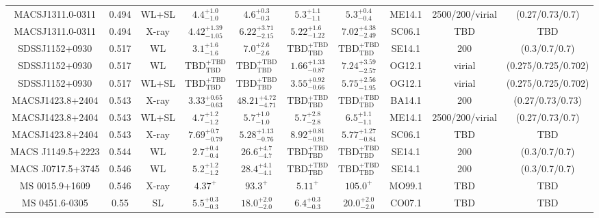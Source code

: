 \begin{table}
\begin{tabular}{cccccccccc}
MACSJ1311.0-0311 & 0.494 & WL+SL & ${4.4}^{+1.0}_{-1.0}$ & ${4.6}^{+0.3}_{-0.3}$ & ${5.3}^{+1.1}_{-1.1}$ & ${5.3}^{+0.4}_{-0.4}$ & ME14.1 & 2500/200/virial & (0.27/0.73/0.7) \\
MACSJ1311.0-0311 & 0.494 & X-ray & ${4.42}^{+1.39}_{-1.05}$ & ${6.22}^{+3.71}_{-2.15}$ & ${5.22}^{+1.6}_{-1.22}$ & ${7.02}^{+4.38}_{-2.49}$ & SC06.1 & TBD & TBD \\
SDSSJ1152+0930 & 0.517 & WL & ${3.1}^{+1.6}_{-1.6}$ & ${7.0}^{+2.6}_{-2.6}$ & ${\mathrm{TBD}}^{+\mathrm{TBD}}_{\mathrm{TBD}}$ & ${\mathrm{TBD}}^{+\mathrm{TBD}}_{\mathrm{TBD}}$ & SE14.1 & 200 & (0.3/0.7/0.7) \\
SDSSJ1152+0930 & 0.517 & WL & ${\mathrm{TBD}}^{+\mathrm{TBD}}_{\mathrm{TBD}}$ & ${\mathrm{TBD}}^{+\mathrm{TBD}}_{\mathrm{TBD}}$ & ${1.66}^{+1.33}_{-0.87}$ & ${7.24}^{+3.59}_{-2.57}$ & OG12.1 & virial & (0.275/0.725/0.702) \\
SDSSJ1152+0930 & 0.517 & WL+SL & ${\mathrm{TBD}}^{+\mathrm{TBD}}_{\mathrm{TBD}}$ & ${\mathrm{TBD}}^{+\mathrm{TBD}}_{\mathrm{TBD}}$ & ${3.55}^{+0.92}_{-0.66}$ & ${5.75}^{+2.56}_{-1.95}$ & OG12.1 & virial & (0.275/0.725/0.702) \\
MACSJ1423.8+2404 & 0.543 & X-ray & ${3.33}^{+0.65}_{-0.63}$ & ${48.21}^{+4.72}_{-4.71}$ & ${\mathrm{TBD}}^{+\mathrm{TBD}}_{\mathrm{TBD}}$ & ${\mathrm{TBD}}^{+\mathrm{TBD}}_{\mathrm{TBD}}$ & BA14.1 & 200 & (0.27/0.73/0.73) \\
MACSJ1423.8+2404 & 0.543 & WL+SL & ${4.7}^{+1.2}_{-1.2}$ & ${5.7}^{+1.0}_{-1.0}$ & ${5.7}^{+2.8}_{-2.8}$ & ${6.5}^{+1.1}_{-1.1}$ & ME14.1 & 2500/200/virial & (0.27/0.73/0.7) \\
MACSJ1423.8+2404 & 0.543 & X-ray & ${7.69}^{+0.7}_{-0.79}$ & ${5.28}^{+1.13}_{-0.76}$ & ${8.92}^{+0.81}_{-0.91}$ & ${5.77}^{+1.27}_{-0.84}$ & SC06.1 & TBD & TBD \\
MACS J1149.5+2223 & 0.544 & WL & ${2.7}^{+0.4}_{-0.4}$ & ${26.6}^{+4.7}_{-4.7}$ & ${\mathrm{TBD}}^{+\mathrm{TBD}}_{\mathrm{TBD}}$ & ${\mathrm{TBD}}^{+\mathrm{TBD}}_{\mathrm{TBD}}$ & SE14.1 & 200 & (0.3/0.7/0.7) \\
MACS J0717.5+3745 & 0.546 & WL & ${5.2}^{+1.2}_{-1.2}$ & ${28.4}^{+4.1}_{-4.1}$ & ${\mathrm{TBD}}^{+\mathrm{TBD}}_{\mathrm{TBD}}$ & ${\mathrm{TBD}}^{+\mathrm{TBD}}_{\mathrm{TBD}}$ & SE14.1 & 200 & (0.3/0.7/0.7) \\
MS 0015.9+1609 & 0.546 & X-ray & ${4.37}^{+}_{}$ & ${93.3}^{+}_{}$ & ${5.11}^{+}_{}$ & ${105.0}^{+}_{}$ & MO99.1 & TBD & TBD \\
MS 0451.6-0305 & 0.55 & SL & ${5.5}^{+0.3}_{-0.3}$ & ${18.0}^{+2.0}_{-2.0}$ & ${6.4}^{+0.3}_{-0.3}$ & ${20.0}^{+2.0}_{-2.0}$ & CO07.1 & TBD & TBD \\

\end{tabular}
\end{table}

